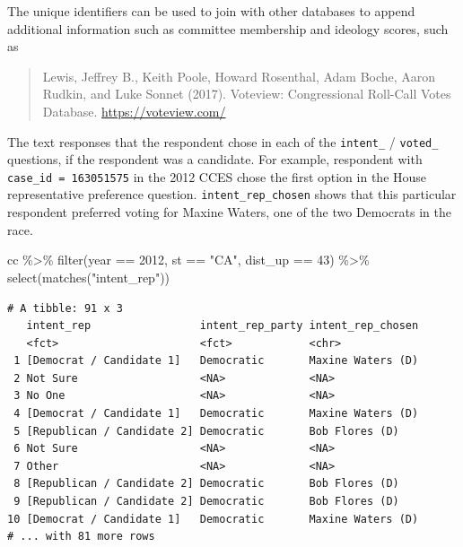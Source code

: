 \documentclass[10pt,article,oneside]{memoir}
\theoremstyle{definition}
\newenvironment{Shaded}{\begin{snugshade}}{\end{snugshade}}
\newcommand{\DecValTok}[1]{\textcolor[rgb]{0.00,0.00,0.81}{#1}}
\newcommand{\FunctionTok}[1]{\textcolor[rgb]{0.00,0.00,0.00}{#1}}
\newcommand{\NormalTok}[1]{#1}
\newcommand{\SpecialCharTok}[1]{\textcolor[rgb]{0.00,0.00,0.00}{#1}}
\newcommand{\StringTok}[1]{\textcolor[rgb]{0.31,0.60,0.02}{#1}}
\begin{document}
The unique identifiers can be used to join with other databases to
append additional information such as committee membership and ideology
scores, such as

\begin{quote}
Lewis, Jeffrey B., Keith Poole, Howard Rosenthal, Adam Boche, Aaron
Rudkin, and Luke Sonnet (2017). Voteview: Congressional Roll-Call Votes
Database. \url{https://voteview.com/}
\end{quote}

The text responses that the respondent chose in each of the
\texttt{intent\_} / \texttt{voted\_} questions, if the respondent was a
candidate. For example, respondent with \texttt{case\_id\ =\ 163051575}
in the 2012 CCES chose the first option in the House representative
preference question. \texttt{intent\_rep\_chosen} shows that this
particular respondent preferred voting for Maxine Waters, one of the two
Democrats in the race.

\begin{Shaded}
\begin{Highlighting}[]
\NormalTok{cc }\SpecialCharTok{\%\textgreater{}\%} 
  \FunctionTok{filter}\NormalTok{(year }\SpecialCharTok{==} \DecValTok{2012}\NormalTok{, st }\SpecialCharTok{==} \StringTok{"CA"}\NormalTok{, dist\_up }\SpecialCharTok{==} \DecValTok{43}\NormalTok{) }\SpecialCharTok{\%\textgreater{}\%} 
  \FunctionTok{select}\NormalTok{(}\FunctionTok{matches}\NormalTok{(}\StringTok{"intent\_rep"}\NormalTok{)) }
\end{Highlighting}
\end{Shaded}

\begin{verbatim}
# A tibble: 91 x 3
   intent_rep                 intent_rep_party intent_rep_chosen
   <fct>                      <fct>            <chr>            
 1 [Democrat / Candidate 1]   Democratic       Maxine Waters (D)
 2 Not Sure                   <NA>             <NA>             
 3 No One                     <NA>             <NA>             
 4 [Democrat / Candidate 1]   Democratic       Maxine Waters (D)
 5 [Republican / Candidate 2] Democratic       Bob Flores (D)   
 6 Not Sure                   <NA>             <NA>             
 7 Other                      <NA>             <NA>             
 8 [Republican / Candidate 2] Democratic       Bob Flores (D)   
 9 [Republican / Candidate 2] Democratic       Bob Flores (D)   
10 [Democrat / Candidate 1]   Democratic       Maxine Waters (D)
# ... with 81 more rows
\end{verbatim}
\end{document}
